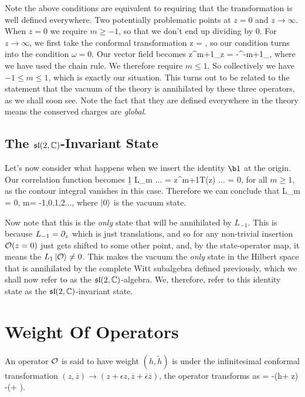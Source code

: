 Note the above conditions are equivalent to requiring that the transformation is well defined everywhere. Two potentially problematic points at $z=0$ and $z\to\infty$. When $z=0$ we require $m\geq-1$, so that we don't end up dividing by $0$. For $z\to\infty$, we first take the conformal transformation
\bse 
    z = ,
\ese 
so our condition turns into the condition $\omega=0$. Our vector field becomes 
\bse 
    z^{m+1}\p_z = -\omega^{-m+1}\p_{\omega},
\ese 
where we have used the chain rule. We therefore require $m \leq 1$. So collectively we have $-1\leq m \leq 1$, which is exactly our situation. This turns out to be related to the statement that the vacuum of the theory is annihilated by these three operators, as we shall soon see. Note the fact that they are defined everywhere in the theory means the conserved charges are \textit{global}. 

\subsection{The $\mathfrak{sl}(2,\mathbb{C})$-Invariant State}

Let's now consider what happens when we insert the identity $\b1$ at the origin. Our correlation function becomes
\bse 
    \langle \b1 L_m ... \rangle = \int \oint {} z^{m+1}T(z) ... = 0,
\ese 
for all $m\geq 1$, as the contour integral vanishes in this case. Therefore we can conclude that 
\be 
    L_m = 0, \qquad \forall m= -1,0,1,2...,
\ee 
where $\ket{0}$ is the vacuum state. 

Now note that this is the \textit{only} state that will be annihilated by $L_{-1}$. This is because $L_{-1}=\partial_z$ which is just translations, and so for any non-trivial insertion $\mathcal{O}(z=0)$ just gets shifted to some other point, and, by the state-operator map, it means the $L_1\ket{\mathcal{O}}\neq 0$. This makes the vacuum the \textit{only} state in the Hilbert space that is annihilated by the complete Witt subalgebra defined previously, which we shall now refer to as the $\mathfrak{sl}(2,\mathbb{C})$-algebra. We, therefore, refer to this identity state as the $\mathfrak{sl}(2,\mathbb{C})$-invariant state.


\section{Weight Of Operators}

An operator $\mathcal{O}$ is said to have weight $(h,\widetilde{h})$ is under the infinitesimal conformal transformation $(z,\overline{z}) \to (z + \epsilon z, \overline{z} + \overline{\epsilon}\overline{z})$, the operator transforms as
\be 
\label{eqn:WeightOfOperator}
    \del \cO = -\epsilon(h\cO + z\p\cO) -\overline{\epsilon}(\cO + \overline{\p}\cO).
\ee 
\ed 


